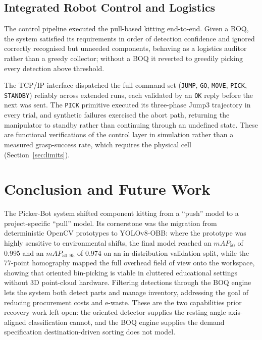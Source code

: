 \documentclass[conference]{IEEEtran}
\begin{document}
\subsection{Integrated Robot Control and Logistics}
The control pipeline executed the pull-based kitting end-to-end. Given a BOQ, the system satisfied its requirements in order of detection confidence and ignored correctly recognised but unneeded components, behaving as a logistics auditor rather than a greedy collector; without a BOQ it reverted to greedily picking every detection above threshold.

The TCP/IP interface dispatched the full command set (\texttt{JUMP}, \texttt{GO}, \texttt{MOVE}, \texttt{PICK}, \texttt{STANDBY}) reliably across extended runs, each validated by an \texttt{OK} reply before the next was sent. The \texttt{PICK} primitive executed its three-phase Jump3 trajectory in every trial, and synthetic failures exercised the abort path, returning the manipulator to standby rather than continuing through an undefined state. These are functional verifications of the control layer in simulation rather than a measured grasp-success rate, which requires the physical cell (Section~\ref{sec:limits}).
\section{Conclusion and Future Work}
The Picker-Bot system shifted component kitting from a ``push'' model to a project-specific ``pull'' model. Its cornerstone was the migration from deterministic OpenCV prototypes to YOLOv8-OBB: where the prototype was highly sensitive to environmental shifts, the final model reached an $mAP_{50}$ of 0.995 and an $mAP_{50\text{--}95}$ of 0.974 on an in-distribution validation split, while the 77-point homography mapped the full overhead field of view onto the workspace, showing that oriented bin-picking is viable in cluttered educational settings without 3D point-cloud hardware. Filtering detections through the BOQ engine lets the system both detect parts and manage inventory, addressing the goal of reducing procurement costs and e-waste. These are the two capabilities prior recovery work left open: the oriented detector supplies the resting angle axis-aligned classification cannot, and the BOQ engine supplies the demand specification destination-driven sorting does not model.
\end{document}
